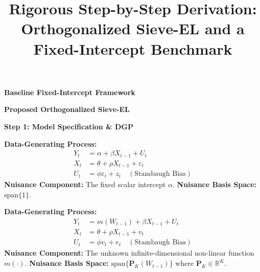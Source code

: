 \documentclass[11pt,landscape]{article}
\begin{document}
\title{\vspace{-1.5cm}Rigorous Step-by-Step Derivation: Orthogonalized Sieve-EL and a Fixed-Intercept Benchmark}
\date{}
\maketitle

\vspace{-1.5cm}
\noindent\hrulefill

\vspace{0.5em}
\noindent
\begin{minipage}[t]{0.48\textwidth}
    \begin{center}
        \Large \textbf{Baseline Fixed-Intercept Framework}
    \end{center}
\end{minipage}%
\hfill
\begin{minipage}[t]{0.48\textwidth}
    \begin{center}
        \Large \textbf{Proposed Orthogonalized Sieve-EL}
    \end{center}
\end{minipage}

\vspace{0.5em}
\noindent\hrulefill
\vspace{1em}

\noindent\textbf{\large Step 1: Model Specification \& DGP} \vspace{0.5em}

\noindent
\begin{minipage}[t]{0.48\textwidth}
\textbf{Data-Generating Process:}
\begin{align}
    Y_t &= \alpha + \beta X_{t-1} + U_t \\
    X_t &= \theta + \rho X_{t-1} + \varepsilon_t \\
    U_t &= \phi \varepsilon_t + z_t \quad (\text{Stambaugh Bias})
\end{align}
\textbf{Nuisance Component:} The fixed scalar intercept $\alpha$. \newline
\textbf{Nuisance Basis Space:} $\text{span}\{1\}$.
\end{minipage}%
\hfill
\begin{minipage}[t]{0.48\textwidth}
\textbf{Data-Generating Process:}
\begin{align}
    Y_t &= m(W_{t-1}) + \beta X_{t-1} + U_t \\
    X_t &= \theta + \rho X_{t-1} + v_t \\
    U_t &= \phi v_t + e_t \quad (\text{Stambaugh Bias})
\end{align}
\textbf{Nuisance Component:} The unknown infinite-dimensional non-linear function $m(\cdot)$. \newline
\textbf{Nuisance Basis Space:} $\text{span}\{\bm{P}_K(W_{t-1})\}$ where $\bm{P}_K \in \mathbb{R}^K$.
\end{minipage}
\end{document}
